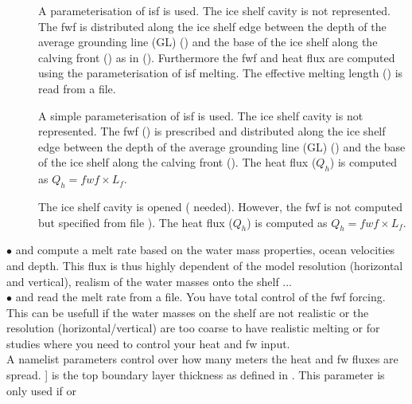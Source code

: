 \documentclass[../tex_main/NEMO_manual]{subfiles}
\begin{document}
\begin{description}
\item[]
A parameterisation of isf is used. The ice shelf cavity is not represented. 
The fwf is distributed along the ice shelf edge between the depth of the average grounding line (GL)
() and the base of the ice shelf along the calving front () as in (). 
Furthermore the fwf and heat flux are computed using the \citet{Beckmann2003} parameterisation of isf melting. 
The effective melting length () is read from a file.

\item[]
A simple parameterisation of isf is used. The ice shelf cavity is not represented. 
The fwf () is prescribed and distributed along the ice shelf edge between the depth of the average grounding line (GL)
() and the base of the ice shelf along the calving front (). 
The heat flux ($Q_h$) is computed as $Q_h = fwf \times L_f$.

\item[]
The ice shelf cavity is opened ( needed). However, the fwf is not computed but specified from file ). 
The heat flux ($Q_h$) is computed as $Q_h = fwf \times L_f$.\\
\end{description}


$\bullet$  and  compute a melt rate based on the water mass properties, ocean velocities and depth.
 This flux is thus highly dependent of the model resolution (horizontal and vertical), realism of the water masses onto the shelf ...\\


$\bullet$  and  read the melt rate from a file. You have total control of the fwf forcing.
This can be usefull if the water masses on the shelf are not realistic or the resolution (horizontal/vertical) are too 
coarse to have realistic melting or for studies where you need to control your heat and fw input.\\ 

A namelist parameters control over how many meters the heat and fw fluxes are spread. 
] is the top boundary layer thickness as defined in \citet{Losch2008}. 
This parameter is only used if  or 
\end{document}
